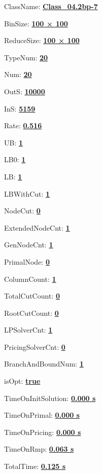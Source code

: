 \documentclass[11pt]{article}
\begin{document}
\pagestyle{empty}


ClassName: \underline{\textbf{Class_04.2bp-7}}
\par
BinSize: \underline{\textbf{100 × 100}}
\par
ReduceSize: \underline{\textbf{100 × 100}}
\par
TypeNum: \underline{\textbf{20}}
\par
Num: \underline{\textbf{20}}
\par
OutS: \underline{\textbf{10000}}
\par
InS: \underline{\textbf{5159}}
\par
Rate: \underline{\textbf{0.516}}
\par
UB: \underline{\textbf{1}}
\par
LB0: \underline{\textbf{1}}
\par
LB: \underline{\textbf{1}}
\par
LBWithCut: \underline{\textbf{1}}
\par
NodeCut: \underline{\textbf{0}}
\par
ExtendedNodeCnt: \underline{\textbf{1}}
\par
GenNodeCnt: \underline{\textbf{1}}
\par
PrimalNode: \underline{\textbf{0}}
\par
ColumnCount: \underline{\textbf{1}}
\par
TotalCutCount: \underline{\textbf{0}}
\par
RootCutCount: \underline{\textbf{0}}
\par
LPSolverCnt: \underline{\textbf{1}}
\par
PricingSolverCnt: \underline{\textbf{0}}
\par
BranchAndBoundNum: \underline{\textbf{1}}
\par
isOpt: \underline{\textbf{true}}
\par
TimeOnInitSolution: \underline{\textbf{0.000 s}}
\par
TimeOnPrimal: \underline{\textbf{0.000 s}}
\par
TimeOnPricing: \underline{\textbf{0.000 s}}
\par
TimeOnRmp: \underline{\textbf{0.063 s}}
\par
TotalTime: \underline{\textbf{0.125 s}}
\par
\newpage
\end{document}

